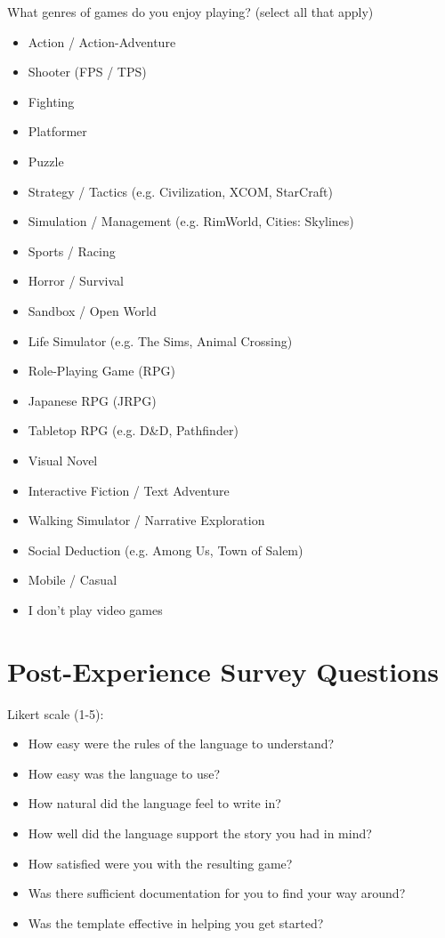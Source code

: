 What genres of games do you enjoy playing? (select all that apply)

\begin{itemize}
    \item Action / Action-Adventure
    \item Shooter (FPS / TPS)
    \item Fighting
    \item Platformer
    \item Puzzle
    \item Strategy / Tactics (e.g. Civilization, XCOM, StarCraft)
    \item Simulation / Management (e.g. RimWorld, Cities: Skylines)
    \item Sports / Racing
    \item Horror / Survival
    \item Sandbox / Open World
    \item Life Simulator (e.g. The Sims, Animal Crossing)
    \item Role-Playing Game (RPG)
    \item Japanese RPG (JRPG)
    \item Tabletop RPG (e.g. D\&D, Pathfinder)
    \item Visual Novel
    \item Interactive Fiction / Text Adventure
    \item Walking Simulator / Narrative Exploration
    \item Social Deduction (e.g. Among Us, Town of Salem)
    \item Mobile / Casual
    \item I don't play video games
\end{itemize}

\section{Post-Experience Survey Questions}

Likert scale (1-5):

\begin{itemize}
    \item How easy were the rules of the language to understand?
    \item How easy was the language to use?
    \item How natural did the language feel to write in?
    \item How well did the language support the story you had in mind?
    \item How satisfied were you with the resulting game?
    \item Was there sufficient documentation for you to find your way around?
    \item Was the template effective in helping you get started?
\end{itemize}

